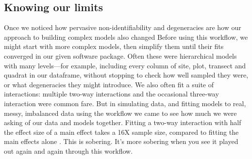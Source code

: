 \documentclass[11pt]{article}
\begin{document}
 \subsection*{Knowing our limits}  %
Once we noticed how pervasive non-identifiability and degeneracies are how our approach to building complex models also changed
Before using this workflow, we might start with more complex models, then simplify them until their fits converged in our given software package. Often these were hierarchical models with many levels---for example, including every column of site, plot, transect and quadrat in our dataframe, without stopping to check how well sampled they were, or what degeneracies they might introduce. %
We also often fit a suite of interactions: multiple two-way interactions and the occasional three-way interaction were common fare. But in simulating data, and fitting models to real, messy, imbalanced data using the workflow we came to see how much we were asking of our data and models together. Fitting a two-way interaction with half the effect size of a main effect takes a 16X sample size, compared to fitting the main effects alone \citep[the main effects then average over the interactions, see][for more details]{regotherstories}. This is sobering. It's more sobering when you see it played out again and again through this workflow. %
\end{document}
